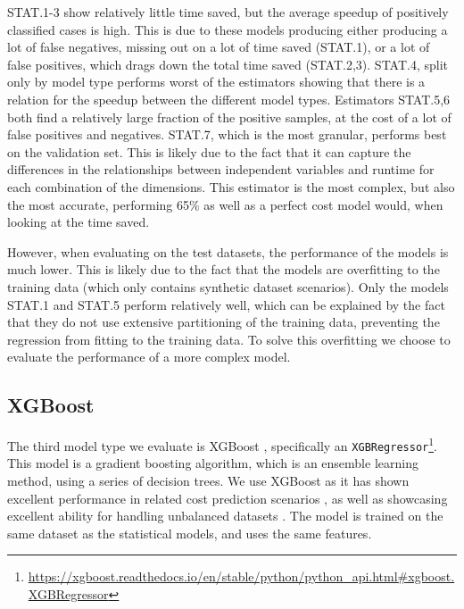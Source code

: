 STAT.1-3 show relatively little time saved, but the average speedup of positively classified cases is high. This is due to these models producing either producing a lot of false negatives, missing out on a lot of time saved (STAT.1), or a lot of false positives, which drags down the total time saved (STAT.2,3). STAT.4, split only by model type performs worst of the estimators showing that there is a relation for the speedup between the different model types. Estimators STAT.5,6 both find a relatively large fraction of the positive samples, at the cost of a lot of false positives and negatives. STAT.7, which is the most granular, performs best on the validation set. This is likely due to the fact that it can capture the differences in the relationships between independent variables and runtime for each combination of the dimensions. This estimator is the most complex, but also the most accurate, performing 65\% as well as a perfect cost model would, when looking at the time saved.

However, when evaluating on the test datasets, the performance of the models is much lower. This is likely due to the fact that the models are overfitting to the training data (which only contains synthetic dataset scenarios). Only the models STAT.1 and STAT.5 perform relatively well, which can be explained by the fact that they do not use extensive partitioning of the training data, preventing the regression from fitting to the training data. To solve this overfitting we choose to evaluate the performance of a more complex model.

\subsection{XGBoost}
The third model type we evaluate is XGBoost \cite{xgboost}, specifically an \texttt{XGBRegressor}\footnote{\url{https://xgboost.readthedocs.io/en/stable/python/python_api.html\#xgboost.XGBRegressor}}. This model is a gradient boosting algorithm, which is an ensemble learning method, using a series of decision trees. We use XGBoost as it has shown excellent performance in related cost prediction scenarios \cite{tvm}, as well as showcasing excellent ability for handling unbalanced datasets \cite{xgboost_imbalanced_data}. The model is trained on the same dataset as the statistical models, and uses the same features.

